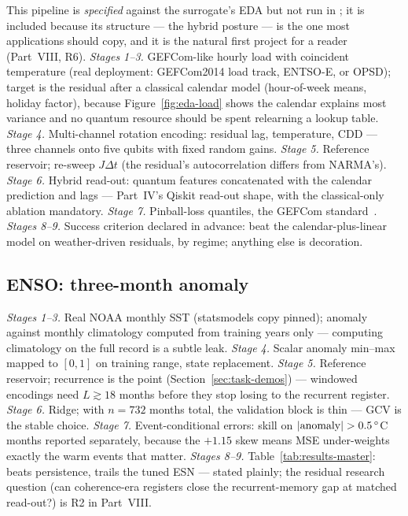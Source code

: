 This pipeline is \emph{specified} against the surrogate's EDA but not run in
; it is included because its structure --- the hybrid
posture --- is the one most applications should copy, and it is the natural
first project for a reader (Part~VIII, R6). \emph{Stages 1--3.} GEFCom-like
hourly load with coincident temperature (real deployment: GEFCom2014 load
track, ENTSO-E, or OPSD); target is the residual after a classical
calendar model (hour-of-week means, holiday factor), because
Figure~\ref{fig:eda-load} shows the calendar explains most variance and no
quantum resource should be spent relearning a lookup table.
\emph{Stage 4.} Multi-channel rotation encoding: residual lag, temperature,
CDD --- three channels onto five qubits with fixed random gains.
\emph{Stage 5.} Reference reservoir; re-sweep $J\Delta t$ (the residual's
autocorrelation differs from NARMA's). \emph{Stage 6.} Hybrid read-out:
quantum features concatenated with the calendar prediction and lags ---
Part~IV's Qiskit read-out shape, with the classical-only ablation mandatory.
\emph{Stage 7.} Pinball-loss quantiles, the GEFCom
standard~\citep{hong2016gefcom}. \emph{Stages 8--9.} Success criterion
declared in advance: beat the calendar-plus-linear model on weather-driven
residuals, by regime; anything else is decoration.

\subsection{ENSO: three-month anomaly}
\label{sec:pipeline-enso}

\emph{Stages 1--3.} Real NOAA monthly SST (statsmodels copy pinned);
anomaly against monthly climatology computed from training years only ---
computing climatology on the full record is a subtle leak. \emph{Stage 4.}
Scalar anomaly min--max mapped to $[0,1]$ on training range,
state replacement. \emph{Stage 5.} Reference reservoir; recurrence is the
point (Section~\ref{sec:task-demos}) --- windowed encodings need
$L \gtrsim 18$ months before they stop losing to the recurrent register.
\emph{Stage 6.} Ridge; with $n=732$ months total, the validation block is
thin --- GCV is the stable choice. \emph{Stage 7.} Event-conditional errors:
skill on $|{\rm anomaly}|>0.5\,^\circ$C months reported separately, because
the $+1.15$ skew means MSE under-weights exactly the warm events that
matter. \emph{Stages 8--9.} Table~\ref{tab:results-master}: beats
persistence, trails the tuned ESN --- stated plainly; the residual research
question (can coherence-era registers close the recurrent-memory gap at
matched read-out?) is R2 in Part~VIII.

